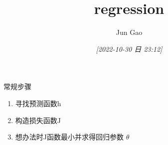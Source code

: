 \documentclass[11pt]{article}
\author{Jun Gao}
\date{\textit{[2022-10-30 日 23:12]}}
\title{regression}
\begin{document}
\maketitle
\tableofcontents

常规步骤
\begin{enumerate}
\item 寻找预测函数h
\item 构造损失函数J
\item 想办法时J函数最小并求得回归参数 \(\theta\)
\end{enumerate}
\end{document}
